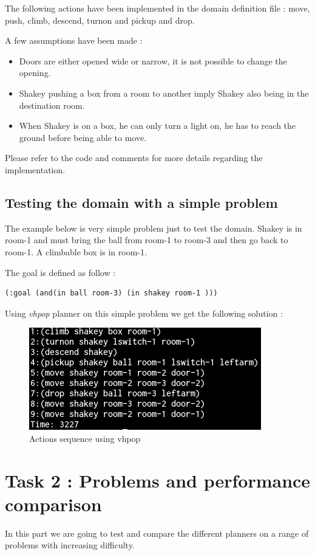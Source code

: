 The following actions have been implemented in the domain definition file :
move, push, climb, descend, turnon and pickup and drop.

A few assumptions have been made :
\begin{itemize}
  \item Doors are either opened wide or narrow, it is not possible to change the
opening.
  \item Shakey pushing a box from a room to another imply Shakey also being in
the destination room.
  \item When Shakey is on a box, he can only turn a light on, he has to reach
the ground before being able to move.
\end{itemize}

Please refer to the code and comments for more details regarding the
implementation.

\newpage
\thispagestyle{empty}
\subsection*{Testing the domain with a simple problem}

The example below is very simple problem just to test the domain.
Shakey is in room-1 and must bring the ball from room-1 to room-3 and then
go back to room-1. A climbable box is in room-1.

The goal is defined as follow :
\begin{verbatim}
(:goal (and(in ball room-3) (in shakey room-1 )))
\end{verbatim}

Using \textit{vhpop} planner on this simple problem we get the following
solution :

\begin{figure}[h]
    \centering
      \includegraphics[width=0.50\linewidth]{./images/prob0_seq.png}
    \caption{Actions sequence using vhpop}
\end{figure}

\section*{Task 2 : Problems and performance comparison}
\thispagestyle{empty}
In this part we are going to test and compare the different planners on a range
of problems with increasing difficulty.

